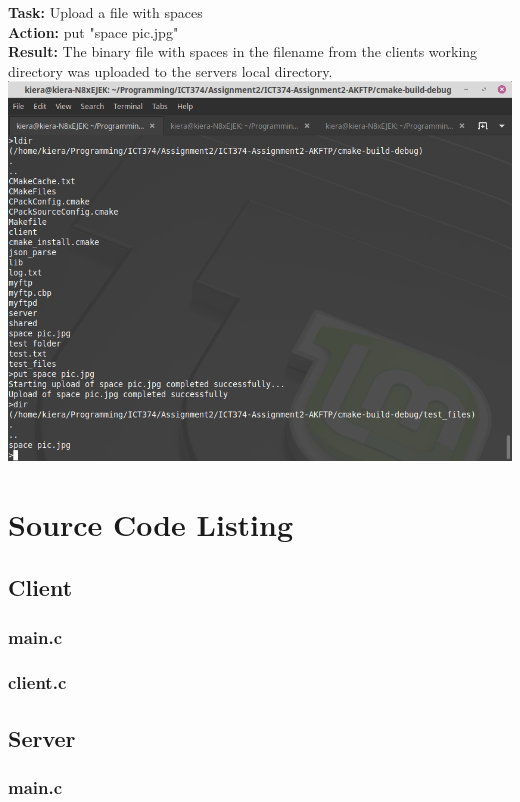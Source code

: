 \documentclass{article}
\begin{document}
\textbf{Task:} Upload a file with spaces\\
\textbf{Action:} put "space pic.jpg"\\
\textbf{Result:} The binary file with spaces in the filename from the clients working directory was uploaded to the servers local directory.\\
\includegraphics[width=\textwidth]{testpictures/space_put}


\newpage
\section{Source Code Listing}
\subsection{Client}
    \subsubsection{main.c}
	
	\subsubsection{client.c}
	
\subsection{Server}
    \subsubsection{main.c}
	
\end{document}
